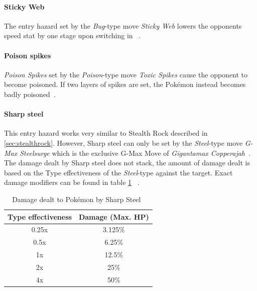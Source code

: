\paragraph{Sticky Web}
The entry hazard set by the \textit{Bug}-type move \textit{Sticky Web} lowers the
opponents speed stat by one stage upon switching in ~\autocite{Bulbapedia:StickyWeb}. 

\paragraph{Poison spikes}
\label{sec:poison-spikes}
\textit{Poison Spikes} set by the \textit{Poison}-type move \textit{Toxic Spikes}
cause the opponent to become poisoned. If two layers of spikes are set, the
Pokémon instead becomes badly poisoned~\autocite{Bulbapedia:ToxicSpikes}.

\paragraph{Sharp steel}
This entry hazard works very similar to Stealth Rock described in \ref{sec:stealthrock}.
However, Sharp steel can only be set by the \textit{Steel}-type move
\textit{G-Max Steelsurge} which is the exclusive G-Max Move of \textit{Gigantamax Copperajah}~\autocite{Bulbapedia:GMaxSteelsurge}.
The damage dealt by Sharp steel does not stack, the amount of damage dealt is
based on the Type effectiveness of the \textit{Steel}-type against the target.
Exact damage modifiers can be found in table \ref{tab:sharp-steel-damage}
~\autocite{Bulbapedia:GMaxSteelsurge}.
\begin{table}[h]
	\centering
	\begin{tabular}{|c|c|}
		\hline
		\textbf{Type effectiveness} & \textbf{Damage (Max. \ac{HP}}) \\
		\hline 
		0.25x & 3.125\% \\ 
		\hline 
		0.5x &  6.25\% \\ 
		\hline 
		1x & 12.5\% \\
		\hline
		2x & 25\% \\
		\hline
		4x & 50\% \\
		\hline
	\end{tabular} 
	\caption{Damage dealt to Pokémon by Sharp Steel~\autocite{Bulbapedia:GMaxSteelsurge}}
	\label{tab:sharp-steel-damage}
\end{table}

